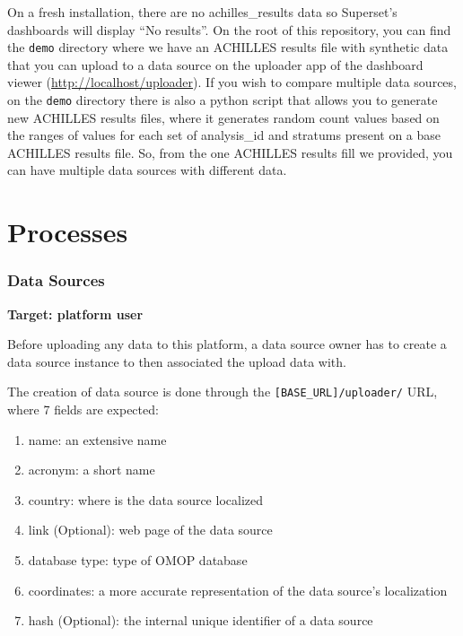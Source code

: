 \documentclass[
]{book}
\providecommand{\tightlist}{%
  \setlength{\itemsep}{0pt}\setlength{\parskip}{0pt}}
\begin{document}
On a fresh installation, there are no achilles\_results data so Superset's dashboards will display ``No results''. On the root of this repository, you can find the \texttt{demo} directory where we have an ACHILLES results file with synthetic data that you can upload to a data source on the uploader app of the dashboard viewer (\url{http://localhost/uploader}). If you wish to compare multiple data sources, on the \texttt{demo} directory there is also a python script that allows you to generate new ACHILLES results files, where it generates random count values based on the ranges of values for each set of analysis\_id and stratums present on a base ACHILLES results file. So, from the one ACHILLES results fill we provided, you can have multiple data sources with different data.

\hypertarget{processes}{%
\chapter{Processes}\label{processes}}

\hypertarget{data-sources}{%
\subsection*{Data Sources}\label{data-sources}}

\textbf{Target: platform user}

Before uploading any data to this platform, a data source owner has to create a data source instance to then associated the upload data with.

The creation of data source is done through the \texttt{{[}BASE\_URL{]}/uploader/} URL, where 7 fields are expected:

\begin{enumerate}
\def\labelenumi{\arabic{enumi}.}
\tightlist
\item
  name: an extensive name
\item
  acronym: a short name
\item
  country: where is the data source localized
\item
  link (Optional): web page of the data source
\item
  database type: type of OMOP database
\item
  coordinates: a more accurate representation of the data source's localization
\item
  hash (Optional): the internal unique identifier of a data source
\end{enumerate}
\end{document}
